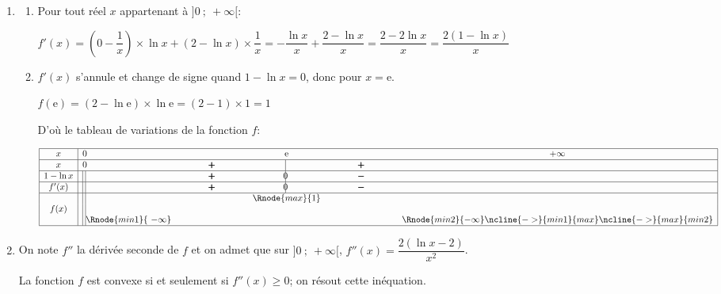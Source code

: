 \documentclass[10pt]{article}
\providecommand{\e}{{\mathrm{e}}}
\begin{document}
\begin{enumerate}
	\item \begin{enumerate}
		\item Pour tout réel $x$ appartenant à $]0~;~+\infty[$: 
		
$f'(x)= \left (0-\dfrac{1}{x}\right ) \times \ln x + (2-\ln x)\times \dfrac{1}{x}
= -\dfrac{\ln x}{x} + \dfrac{2-\ln x}{x}
= \dfrac{2-2\ln x}{x}
= \dfrac{2 \left (1-\ln x\right )}{x}$

		\item 
$f'(x)$ s'annule et change de signe quand $1-\ln x = 0$, donc pour $x=\e$.

$f(\e)= (2-\ln\e)\times \ln\e = (2-1)\times 1=1$

D'où le tableau de variations de la fonction $f$:

\begin{center}
{\renewcommand{\arraystretch}{1.3}
\def\esp{\hspace*{2.5cm}}
\def\hauteur{0pt}
$\begin{array}{|c| l *4{c}|}
\hline
x & 0  & \esp & \e & \esp & +\infty \\ 
\hline
x & 0  &   \pmb{+} & \vline\hspace{-2.7pt}{\phantom 0} & \pmb{+} & \\ 
\hline
1-\ln x &\vline\;\vline  &   \pmb{+} & \vline\hspace{-2.7pt}0 & \pmb{-} & \\ 
\hline
f'(x) &\vline\;\vline  &   \pmb{+} & \vline\hspace{-2.7pt}0 & \pmb{-} & \\ 
\hline
 &\vline\;\vline &  &   \Rnode{max}{1}  &  &   \\  
f(x) &\vline\;\vline &     &  &  &  \rule{0pt}{\hauteur} \\ 
 &\vline\;\vline \Rnode{min1}{~-\infty} &   &  &  &   \Rnode{min2}{-\infty} \rule{0pt}{\hauteur}    
 \ncline{->}{min1}{max} 
 \ncline{->}{max}{min2} 
 \\ 
\hline
\end{array} $
}
\end{center}			

	\end{enumerate}

	\item On note $f''$ la dérivée seconde de $f$ et on admet que sur $]0~;~+\infty[$, $f''(x) = \dfrac{2(\ln x-2)}{x^{2}}$.



La fonction $f$ est convexe si et seulement si $f''(x)\geqslant 0$; on résout cette inéquation.


\end{enumerate}
\end{document}
